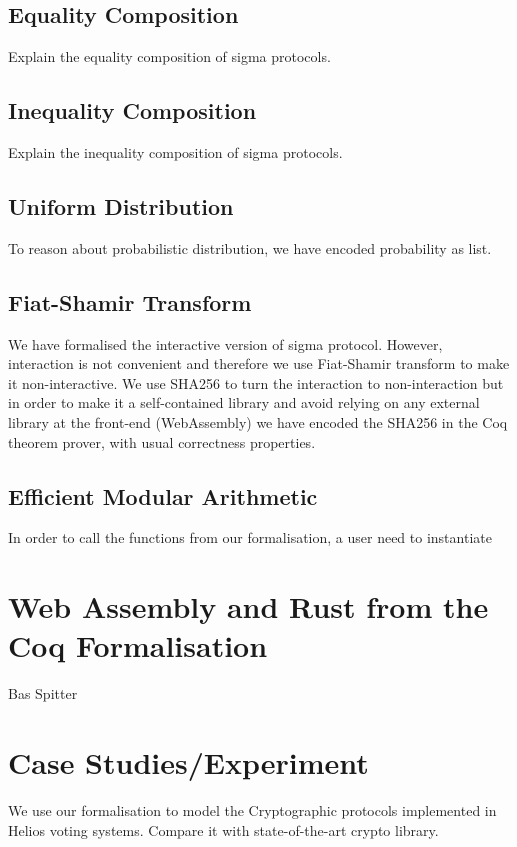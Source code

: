\documentclass[sigconf]{acmart}
\begin{document}
  \subsection{Equality Composition}
  Explain the equality composition of sigma protocols.

  \subsection{Inequality Composition}
  Explain the inequality composition of sigma protocols.

  
  \subsection{Uniform Distribution}
  To reason about probabilistic distribution, 
  we have encoded probability as list. 

  \subsection{Fiat-Shamir Transform}
 We have formalised the interactive version of sigma protocol. However,
 interaction is not convenient and therefore
 we use Fiat-Shamir transform to make it non-interactive. We use SHA256 
 to turn the interaction to non-interaction but in order to 
 make it a self-contained library and 
 avoid relying on any external library at the front-end (WebAssembly)
 we have encoded the SHA256 in the Coq theorem prover, with usual correctness 
 properties. 

 \subsection{Efficient Modular Arithmetic}
  In order to call the functions from our formalisation, 
  a user need to instantiate 

\section{Web Assembly and Rust from the Coq Formalisation}
  Bas Spitter


\section{Case Studies/Experiment}
  We use our formalisation to model the Cryptographic protocols implemented in 
  Helios voting systems. Compare it with state-of-the-art 
  crypto library. 
\end{document}

